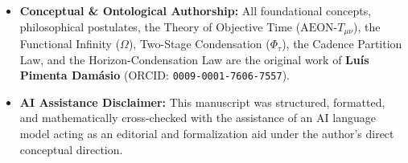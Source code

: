 \documentclass[
]{article}
\providecommand{\tightlist}{%
  \setlength{\itemsep}{0pt}\setlength{\parskip}{0pt}}
\begin{document}
\begin{itemize}
\tightlist
\item
  \textbf{Conceptual \& Ontological Authorship:} All foundational
  concepts, philosophical postulates, the Theory of Objective Time
  (\(\text{AEON-}T_{\mu\nu}\)), the Functional Infinity (\(\Omega\)),
  Two-Stage Condensation (\(\Phi_\tau\)), the Cadence Partition Law, and
  the Horizon-Condensation Law are the original work of \textbf{Luís
  Pimenta Damásio} (ORCID: \texttt{0009-0001-7606-7557}).
\item
  \textbf{AI Assistance Disclaimer:} This manuscript was structured,
  formatted, and mathematically cross-checked with the assistance of an
  AI language model acting as an editorial and formalization aid under
  the author's direct conceptual direction.
\end{itemize}
\end{document}
